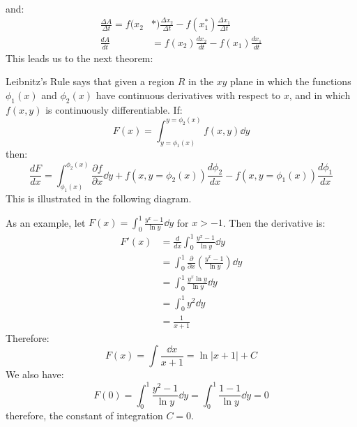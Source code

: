 \begin{itemize}
\begin{align}
    \end{align}
    and:
    \begin{align}
        \frac{\Delta A}{\Delta t} = f(x_2&*)\frac{\Delta x_2}{\Delta t} - f(x_1^*) \frac{\Delta x_1}{\Delta t} \\ 
        \frac{dA}{dt} &= f(x_2)\frac{dx_2}{dt} - f(x_1)\frac{dx_1}{dt}
    \end{align}
    This leads us to the next theorem:
    \begin{theorem}
        Leibnitz's Rule says that given a region $R$ in the $xy$ plane in which the functions $\phi_1(x)$ and $\phi_2(x)$ have continuous derivatives with respect to $x$, and in which $f(x,y)$ is continuously differentiable. If:
        \begin{equation}
            F(x) = \int_{y=\phi_1(x)}^{y=\phi_2(x)} f(x,y) \dd{y}
        \end{equation}
        then:
        \begin{equation}
            \frac{dF}{dx} = \int_{\phi_1(x)}^{\phi_2(x)} \frac{\partial f}{\partial x}\dd{y} + f(x,y=\phi_2(x))\frac{d\phi_2}{dx} - f(x,y=\phi_1(x))\frac{d\phi_1}{dx}
        \end{equation}
        This is illustrated in the following diagram.
        \begin{center}
        \end{center}
    \end{theorem}
    \begin{example}
        As an example, let $F(x) = \int_0^1 \frac{y^x-1}{\ln y} \dd{y}$ for $x > -1$. Then the derivative is:
        \begin{align}
            F'(x) &= \frac{d}{dx}\int_0^1 \frac{y^x-1}{\ln y}\dd{y} \\ 
            &= \int_0^1 \frac{\partial}{\partial x} \left(\frac{y^x-1}{\ln y}\right)\dd{y} \\ 
            &= \int_0^1 \frac{y^x\ln y}{\ln y}\dd{y} \\ 
            &= \int_0^1 y^2 \dd{y} \\ 
            &= \frac{1}{x+1}
        \end{align}
        Therefore:
        \begin{equation}
            F(x) = \int \frac{\dd{x}}{x+1} = \ln|x+1| + C
        \end{equation}
        We also have:
        \begin{equation}
            F(0) = \int_0^1 \frac{y^2-1}{\ln y} \dd{y} = \int_0^1 \frac{1-1}{\ln y}\dd{y} = 0 
        \end{equation}
        therefore, the constant of integration $C=0$.
    \end{example}
\end{itemize}